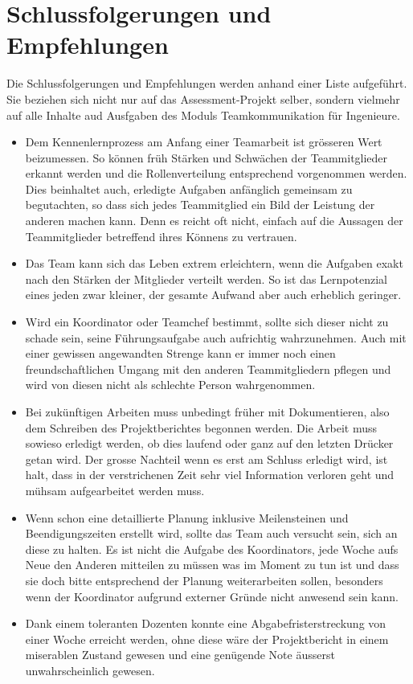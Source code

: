 \chapter{Schlussfolgerungen und Empfehlungen}
Die Schlussfolgerungen und Empfehlungen werden anhand einer Liste aufgeführt. Sie beziehen sich nicht nur auf das Assessment-Projekt selber, sondern vielmehr auf alle Inhalte aud Ausfgaben des Moduls Teamkommunikation für Ingenieure. 

\begin{itemize}
\item Dem Kennenlernprozess am Anfang einer Teamarbeit ist grösseren Wert beizumessen. So können früh Stärken und Schwächen der Teammitglieder erkannt werden und die Rollenverteilung entsprechend vorgenommen werden. Dies beinhaltet auch, erledigte Aufgaben anfänglich gemeinsam zu begutachten, so dass sich jedes Teammitglied ein Bild der Leistung der anderen machen kann. Denn es reicht oft nicht, einfach auf die Aussagen der Teammitglieder betreffend ihres Könnens zu vertrauen.
\item Das Team kann sich das Leben extrem erleichtern, wenn die Aufgaben exakt nach den Stärken der Mitglieder verteilt werden. So ist das Lernpotenzial eines jeden zwar kleiner, der gesamte Aufwand aber auch erheblich geringer.
\item Wird ein Koordinator oder Teamchef bestimmt, sollte sich dieser nicht zu schade sein, seine Führungsaufgabe auch aufrichtig wahrzunehmen. Auch mit einer gewissen angewandten Strenge kann er immer noch einen freundschaftlichen Umgang mit den anderen Teammitgliedern pflegen und wird von diesen nicht als schlechte Person wahrgenommen.
\item Bei zukünftigen Arbeiten muss unbedingt früher mit Dokumentieren, also dem Schreiben des Projektberichtes begonnen werden. Die Arbeit muss sowieso erledigt werden, ob dies laufend oder ganz auf den letzten Drücker getan wird. Der grosse Nachteil wenn es erst am Schluss erledigt wird, ist halt, dass in der verstrichenen Zeit sehr viel Information verloren geht und mühsam aufgearbeitet werden muss.
\item Wenn schon eine detaillierte Planung inklusive Meilensteinen und Beendigungszeiten erstellt wird, sollte das Team auch versucht sein, sich an diese zu halten. Es ist nicht die Aufgabe des Koordinators, jede Woche aufs Neue den Anderen mitteilen zu müssen was im Moment zu tun ist und dass sie doch bitte entsprechend der Planung weiterarbeiten sollen, besonders wenn der Koordinator aufgrund externer Gründe nicht anwesend sein kann.
\item Dank einem toleranten Dozenten konnte eine Abgabefristerstreckung von einer Woche erreicht werden, ohne diese wäre der Projektbericht in einem miserablen Zustand gewesen und eine genügende Note äusserst unwahrscheinlich gewesen.
\end{itemize}

